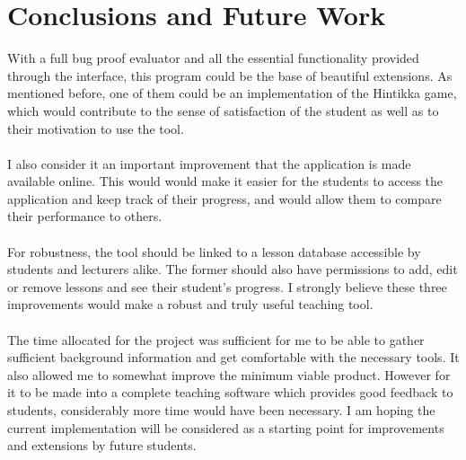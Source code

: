 \documentclass{report}
\begin{document}
\section{Conclusions and Future Work}
With a full bug proof evaluator and all the essential functionality provided 
through the interface, this program could be the base of beautiful extensions. 
As mentioned before, one of them could be an implementation of the Hintikka 
game, which would contribute to the sense of satisfaction of the student as 
well as to their motivation to use the tool. 
\\ \\
I also consider it an important improvement that the application is made 
available online. This would would make it easier for the students to access the 
application and keep track of their progress, and would allow them to compare 
their performance to others.
\\ \\ 
For robustness, the tool should be linked to a lesson database accessible by
students and lecturers alike. The former should also have permissions to add,
edit or remove lessons and see their student's progress. I strongly believe
these three improvements would make a robust and truly useful teaching tool.
\\ \\
The time allocated for the project was sufficient for me to be able to gather
sufficient background information and get comfortable with the necessary tools.
It also allowed me to somewhat improve the minimum viable product. However for
it to be made into a complete teaching software which provides good feedback to
students, considerably more time would have been necessary. I am hoping the
current implementation will be considered as a starting point for improvements
and extensions by future students.
\end{document}
